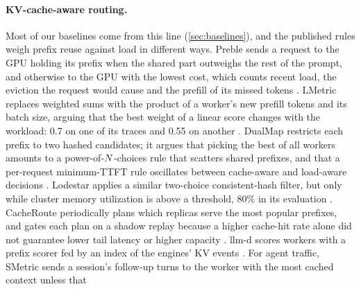 \paragraph{KV-cache-aware routing.}
Most of our baselines come from this line (\cref{sec:baselines}), and the published rules weigh
prefix reuse against load in different ways.
Preble sends a request to the GPU holding its prefix when the shared part outweighs the rest of
the prompt, and otherwise to the GPU with the lowest cost, which counts recent load, the eviction
the request would cause and the prefill of its missed tokens \citep{srivatsa2025preble}.
LMetric replaces weighted sums with the product of a worker's new prefill tokens and its batch
size, arguing that the best weight of a linear score changes with the workload: 0.7 on one of
its traces and 0.55 on another \citep{zhang2026lmetric}.
DualMap restricts each prefix to two hashed candidates; it argues that picking the best of all
workers amounts to a power-of-$N$-choices rule that scatters shared prefixes, and that a
per-request minimum-TTFT rule oscillates between cache-aware and load-aware decisions
\citep{yuan2026dualmap}.
Lodestar applies a similar two-choice consistent-hash filter, but only while cluster memory
utilization is above a threshold, 80\% in its evaluation \citep{lim2026lodestar}.
CacheRoute periodically plans which replicas serve the most popular prefixes, and gates each plan
on a shadow replay because a higher cache-hit rate alone did not guarantee lower tail latency or
higher capacity \citep{cheng2026cacheroute}.
llm-d scores workers with a prefix scorer fed by an index of the engines' KV events
\citep{llmd2025kvcache}.
For agent traffic,
SMetric sends a session's follow-up turns to the worker with the most cached context unless that
